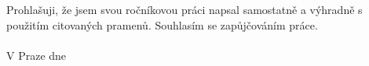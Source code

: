\vspace{9cm}

\noindent
Prohlašuji, že jsem svou ročníkovou práci napsal samostatně a výhradně s použitím
citovaných pramenů. Souhlasím se zapůjčováním práce.\\\\
V Praze dne \date \hfill \name

\thispagestyle{empty}
